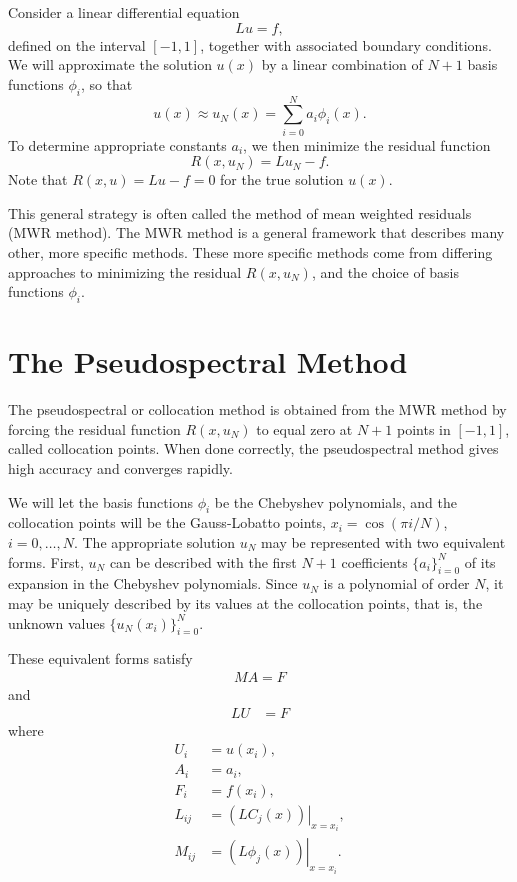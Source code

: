 \label{lab:pseudospectral1_revision}

Consider a linear differential equation
\[Lu = f, \]
defined on the interval $[-1,1]$, together with associated boundary conditions.
We will approximate the solution $u(x)$ by a linear combination of $N+1$ basis functions $\phi_i$, so that
\[
u(x) \approx u_N(x) = \sum_{i=0}^N a_i \phi_i(x).
\]
To determine appropriate constants $a_i$, we then minimize the residual function
\[
R(x,u_N) = Lu_N - f.
\]
Note that $R(x,u) = Lu - f = 0$ for the true solution $u(x)$.

This general strategy is often called the method of mean weighted residuals (MWR method). The MWR method is a general framework that describes many other, more specific methods. These more specific methods come from differing approaches to minimizing the residual $R(x,u_N)$, and the choice of basis functions $\phi_i$.


\section*{The Pseudospectral Method}
The pseudospectral or collocation method is obtained from the MWR method by forcing the residual function $R(x,u_N)$ to equal zero at $N+1$ points in $[-1,1]$, called collocation points.
When done correctly, the pseudospectral method gives high accuracy and converges rapidly.

We will let the basis functions $\phi_i$ be the Chebyshev polynomials, and the collocation points will be the Gauss-Lobatto points, $x_i = \cos(\pi i /N)$, $ i = 0, \ldots, N$.
The appropriate solution $u_N$ may be represented with two equivalent forms.
First, $u_N$ can be described with the first $N+1$ coefficients  $\{a_i\}_{i=0}^N$ of its expansion in the Chebyshev polynomials.
Since $u_N$ is a polynomial of order $N$, it may be uniquely described by its values at the collocation points, that is, the unknown values  $\{u_N(x_i)\}_{i=0}^N$.

These equivalent forms satisfy
\begin{align}
	MA = F \label{spectral1b:chebychev_expansion}
\end{align}
and
\begin{align}
	LU &= F \label{spectral1b:grid_point}
\end{align}
where
\begin{align*}
	U_i &= u(x_i),\\
	A_i &= a_i,\\
	F_i &= f(x_i),\\
	L_{ij} &= \left.(LC_j(x))\right|_{x=x_i},\\
	M_{ij} &= \left.(L\phi_j(x))\right|_{x=x_i}.
\end{align*}


